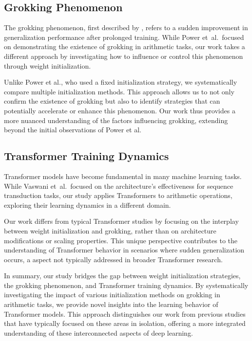 \documentclass{article} %
\begin{document}
\subsection{Grokking Phenomenon}
The grokking phenomenon, first described by \citet{power2022grokking}, refers to a sudden improvement in generalization performance after prolonged training. While Power et~al.\ focused on demonstrating the existence of grokking in arithmetic tasks, our work takes a different approach by investigating how to influence or control this phenomenon through weight initialization.

Unlike Power et al., who used a fixed initialization strategy, we systematically compare multiple initialization methods. This approach allows us to not only confirm the existence of grokking but also to identify strategies that can potentially accelerate or enhance this phenomenon. Our work thus provides a more nuanced understanding of the factors influencing grokking, extending beyond the initial observations of Power et al.

\subsection{Transformer Training Dynamics}
Transformer models \citep{vaswani2017attention} have become fundamental in many machine learning tasks. While Vaswani et~al.\ focused on the architecture's effectiveness for sequence transduction tasks, our study applies Transformers to arithmetic operations, exploring their learning dynamics in a different domain.

Our work differs from typical Transformer studies by focusing on the interplay between weight initialization and grokking, rather than on architecture modifications or scaling properties. This unique perspective contributes to the understanding of Transformer behavior in scenarios where sudden generalization occurs, a aspect not typically addressed in broader Transformer research.

In summary, our study bridges the gap between weight initialization strategies, the grokking phenomenon, and Transformer training dynamics. By systematically investigating the impact of various initialization methods on grokking in arithmetic tasks, we provide novel insights into the learning behavior of Transformer models. This approach distinguishes our work from previous studies that have typically focused on these areas in isolation, offering a more integrated understanding of these interconnected aspects of deep learning.
\end{document}

